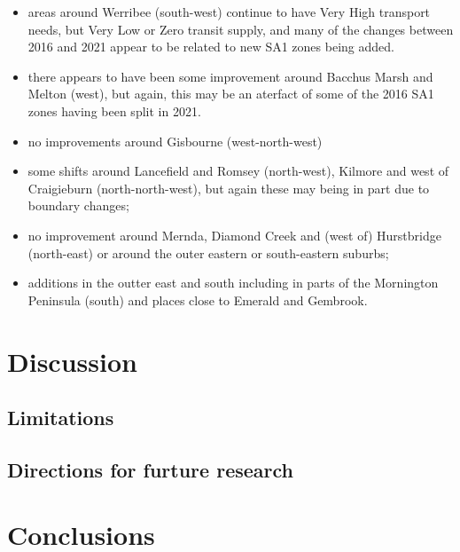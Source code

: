 \documentclass[preprint, 3p,
authoryear]{elsarticle} %
\providecommand{\tightlist}{%
  \setlength{\itemsep}{0pt}\setlength{\parskip}{0pt}}
\begin{document}
\begin{itemize}
\tightlist
\item
  areas around Werribee (south-west) continue to have Very High
  transport needs, but Very Low or Zero transit supply, and many of the
  changes between 2016 and 2021 appear to be related to new SA1 zones
  being added.
\item
  there appears to have been some improvement around Bacchus Marsh and
  Melton (west), but again, this may be an aterfact of some of the 2016
  SA1 zones having been split in 2021.\\
\item
  no improvements around Gisbourne (west-north-west)
\item
  some shifts around Lancefield and Romsey (north-west), Kilmore and
  west of Craigieburn (north-north-west), but again these may being in
  part due to boundary changes;
\item
  no improvement around Mernda, Diamond Creek and (west of) Hurstbridge
  (north-east) or around the outer eastern or south-eastern suburbs;
\item
  additions in the outter east and south including in parts of the
  Mornington Peninsula (south) and places close to Emerald and Gembrook.
\end{itemize}

\hypertarget{discussion}{%
\section{Discussion}\label{discussion}}

\hypertarget{limitations}{%
\subsection{Limitations}\label{limitations}}

\hypertarget{directions-for-furture-research}{%
\subsection{Directions for furture
research}\label{directions-for-furture-research}}

\hypertarget{conclusions}{%
\section{Conclusions}\label{conclusions}}

\renewcommand\refname{References}

\end{document}
